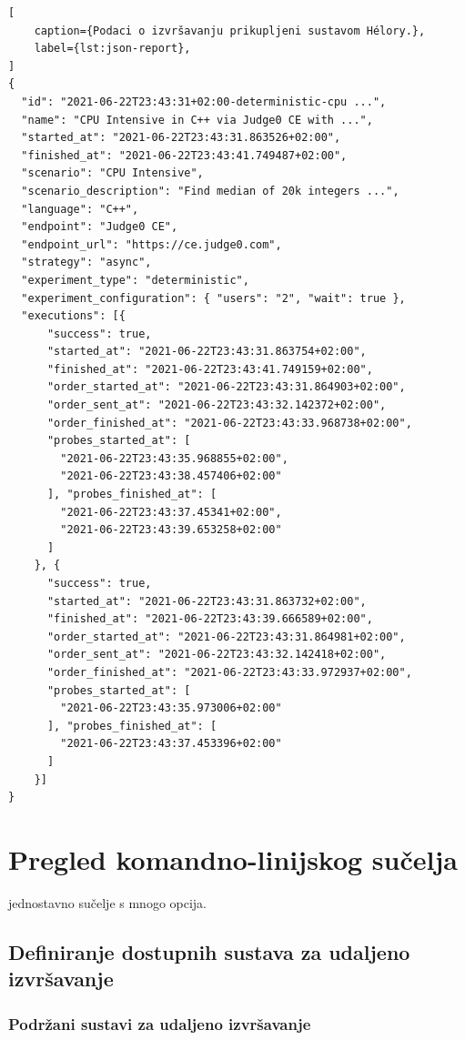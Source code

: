 \documentclass[times, utf8, diplomski]{fer}
\begin{document}
\begin{lstlisting}[
    caption={Podaci o izvršavanju prikupljeni sustavom Hélory.},
    label={lst:json-report},
]
{ 
  "id": "2021-06-22T23:43:31+02:00-deterministic-cpu ...",
  "name": "CPU Intensive in C++ via Judge0 CE with ...",
  "started_at": "2021-06-22T23:43:31.863526+02:00",
  "finished_at": "2021-06-22T23:43:41.749487+02:00",
  "scenario": "CPU Intensive",
  "scenario_description": "Find median of 20k integers ...",
  "language": "C++",
  "endpoint": "Judge0 CE",
  "endpoint_url": "https://ce.judge0.com",
  "strategy": "async",
  "experiment_type": "deterministic",
  "experiment_configuration": { "users": "2", "wait": true },
  "executions": [{
      "success": true,
      "started_at": "2021-06-22T23:43:31.863754+02:00",
      "finished_at": "2021-06-22T23:43:41.749159+02:00",
      "order_started_at": "2021-06-22T23:43:31.864903+02:00",
      "order_sent_at": "2021-06-22T23:43:32.142372+02:00",
      "order_finished_at": "2021-06-22T23:43:33.968738+02:00",
      "probes_started_at": [
        "2021-06-22T23:43:35.968855+02:00",
        "2021-06-22T23:43:38.457406+02:00"
      ], "probes_finished_at": [
        "2021-06-22T23:43:37.45341+02:00",
        "2021-06-22T23:43:39.653258+02:00"
      ]
    }, {
      "success": true,
      "started_at": "2021-06-22T23:43:31.863732+02:00",
      "finished_at": "2021-06-22T23:43:39.666589+02:00",
      "order_started_at": "2021-06-22T23:43:31.864981+02:00",
      "order_sent_at": "2021-06-22T23:43:32.142418+02:00",
      "order_finished_at": "2021-06-22T23:43:33.972937+02:00",
      "probes_started_at": [
        "2021-06-22T23:43:35.973006+02:00"
      ], "probes_finished_at": [
        "2021-06-22T23:43:37.453396+02:00"
      ]
    }]
}
\end{lstlisting}

\pagebreak

\section{Pregled komandno-linijskog sučelja}
jednostavno sučelje s mnogo opcija.

\subsection{Definiranje dostupnih sustava za udaljeno izvršavanje}
\subsubsection{Podržani sustavi za udaljeno izvršavanje}
\end{document}
